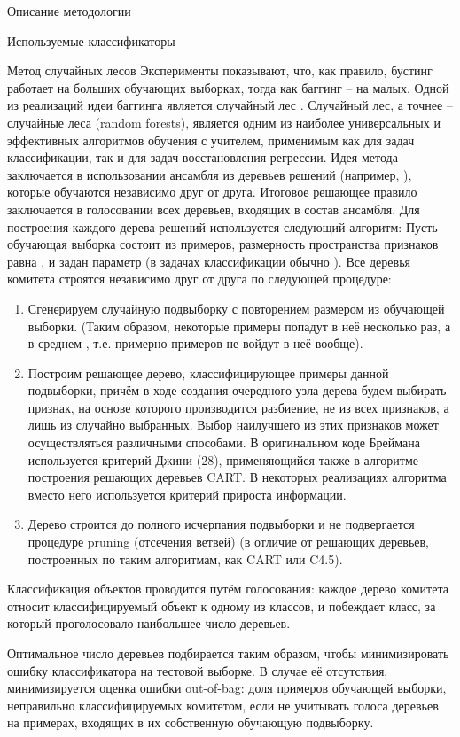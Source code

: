 \begin{section}{Описание методологии}
\begin{subsection}{Используемые классификаторы}
\begin{subsubsection}{Метод случайных лесов}
Эксперименты показывают, что, как правило, бустинг работает на больших обучающих выборках, тогда как баггинг – на малых.
Одной из реализаций идеи баггинга является случайный лес \cite{Breiman}.
Случайный лес, а точнее – случайные леса (random forests), является одним из наиболее универсальных и эффективных алгоритмов обучения с учителем, применимым как для задач классификации, так и для задач восстановления регрессии. Идея метода \cite{Breiman} заключается в использовании ансамбля из  деревьев решений (например, ), которые обучаются независимо друг от друга. Итоговое решающее правило заключается в голосовании всех деревьев, входящих в состав ансамбля.
Для построения каждого дерева решений используется следующий алгоритм:
Пусть обучающая выборка состоит из  примеров, размерность пространства признаков равна , и задан параметр  (в задачах классификации обычно ).
Все деревья комитета строятся независимо друг от друга по следующей процедуре:
\begin{enumerate}
  \item Сгенерируем случайную подвыборку с повторением размером  из обучающей выборки. (Таким образом, некоторые примеры попадут в неё несколько раз, а в среднем , т.е. примерно  примеров не войдут в неё вообще).
  \item Построим решающее дерево, классифицирующее примеры данной подвыборки, причём в ходе создания очередного узла дерева будем выбирать признак, на основе которого производится разбиение, не из всех  признаков, а лишь из  случайно выбранных. Выбор наилучшего из этих  признаков может осуществляться различными способами. В оригинальном коде Бреймана используется критерий Джини (28), применяющийся также в алгоритме построения решающих деревьев CART. В некоторых реализациях алгоритма вместо него используется критерий прироста информации.
  \item Дерево строится до полного исчерпания подвыборки и не подвергается процедуре pruning (отсечения ветвей) (в отличие от решающих деревьев, построенных по таким алгоритмам, как CART или C4.5).
\end{enumerate}

Классификация объектов проводится путём голосования: каждое дерево комитета относит классифицируемый объект к одному из классов, и побеждает класс, за который проголосовало наибольшее число деревьев.

Оптимальное число деревьев подбирается таким образом, чтобы минимизировать ошибку классификатора на тестовой выборке. В случае её отсутствия, минимизируется оценка ошибки out-of-bag: доля примеров обучающей выборки, неправильно классифицируемых комитетом, если не учитывать голоса деревьев на примерах, входящих в их собственную обучающую подвыборку.


\end{subsubsection}
\end{subsection}
\end{section}
